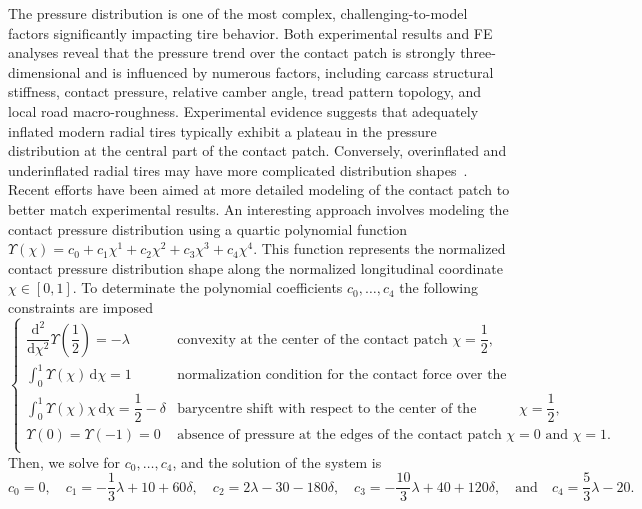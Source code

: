 The pressure distribution is one of the most complex, challenging-to-model factors significantly impacting tire behavior. Both experimental results and \ac{FE} analyses reveal that the pressure trend over the contact patch is strongly three-dimensional and is influenced by numerous factors, including carcass structural stiffness, contact pressure, relative camber angle, tread pattern topology, and local road macro-roughness. Experimental evidence suggests that adequately inflated modern radial tires typically exhibit a plateau in the pressure distribution at the central part of the contact patch. Conversely, overinflated and underinflated radial tires may have more complicated distribution shapes~\cite{nakajima2019advanced, sakai1995measurement}. Recent efforts have been aimed at more detailed modeling of the contact patch to better match experimental results. An interesting approach involves modeling the contact pressure distribution using a quartic polynomial function $\Upsilon(\chi) = c_0 + c_1\chi^1 + c_2\chi^2 + c_3\chi^3 + c_4\chi^4$. This function represents the normalized contact pressure distribution shape along the normalized longitudinal coordinate $\chi \in [0, 1]$. To determinate the polynomial coefficients $c_0, \dots, c_4$ the following constraints are imposed
%
\begin{equation*}
  \begin{cases}
    \dfrac{\mathrm{d}^2}{\mathrm{d}\chi^2}\Upsilon\left(\dfrac{1}{2}\right) = -\lambda & \text{convexity at the center of the contact patch $\chi = \dfrac{1}{2}$,}
    \\[1em]
    \displaystyle\int_{0}^{1} \Upsilon(\chi)\,\mathrm{d}\chi = 1 & \text{normalization condition for the contact force over the contact patch,}
    \\[1em]
    \displaystyle\int_{0}^{1} \Upsilon(\chi)\chi\,\mathrm{d}\chi = \dfrac{1}{2} - \delta & \text{barycentre shift with respect to the center of the contact patch $\chi = \dfrac{1}{2}$,}
    \\[1.5em]
    \Upsilon(0) = \Upsilon(-1) = 0 & \text{absence of pressure at the edges of the contact patch $\chi = 0$ and $\chi = 1$.}
    \\[0.5em]
  \end{cases}
\end{equation*}
%
Then, we solve for $c_0, \dots, c_4$, and the solution of the system is
%
\begin{equation*}
  c_0 = 0, \quad
  c_1 = -\dfrac{1}{3}\lambda + 10 + 60\delta, \quad
  c_2 = 2\lambda - 30 - 180\delta, \quad
  c_3 = -\dfrac{10}{3}\lambda + 40 + 120\delta, \quad \text{and} \quad
  c_4 = \dfrac{5}{3}\lambda - 20.
\end{equation*}

